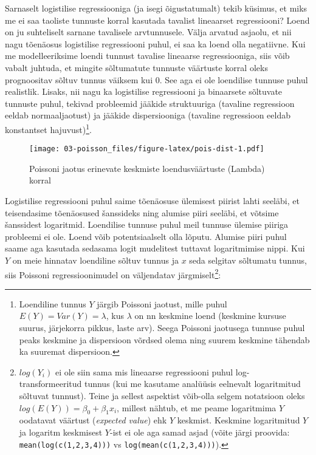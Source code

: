 \documentclass[
]{book}
\begin{document}
Sarnaselt logistilise regressiooniga (ja isegi õigustatumalt) tekib küsimus, et miks me ei saa taoliste tunnuste korral kasutada tavalist lineaarset regressiooni? Loend on ju suhteliselt sarnane tavalisele arvtunnusele. Välja arvatud asjaolu, et nii nagu tõenäosus logistilise regressiooni puhul, ei saa ka loend olla negatiivne. Kui me modelleeriksime loendi tunnust tavalise lineaarse regressiooniga, siis võib vabalt juhtuda, et mingite sõltumatute tunnuste väärtuste korral oleks prognoositav sõltuv tunnus väiksem kui 0. See aga ei ole loendilise tunnuse puhul realistlik. Lisaks, nii nagu ka logistilise regressiooni ja binaarsete sõltuvate tunnuste puhul, tekivad probleemid jääkide struktuuriga (tavaline regressioon eeldab normaaljaotust) ja jääkide dispersiooniga (tavaline regressioon eeldab konstantset hajuvust)\footnote{Loendiline tunnus \(Y\) järgib Poissoni jaotust, mille puhul \(E(Y)=Var(Y)=\lambda\), kus \(\lambda\) on nn keskmine loend (keskmine kursuse suurus, järjekorra pikkus, laste arv). Seega Poissoni jaotusega tunnuse puhul peaks keskmine ja dispersioon võrdsed olema ning suurem keskmine tähendab ka suuremat dispersioon.}.

\begin{figure}
\centering
\texttt{[image: 03-poisson\_files/figure-latex/pois-dist-1.pdf]}
\caption{\label{fig:pois-dist}Poissoni jaotus erinevate keskmiste loendusväärtuste (Lambda) korral}
\end{figure}

Logistilise regressiooni puhul saime tõenäosuse ülemisest piirist lahti seeläbi, et teisendasime tõenäosused šanssideks ning alumise piiri seeläbi, et võtsime šanssidest logaritmid. Loendilise tunnuse puhul meil tunnuse ülemise piiriga probleemi ei ole. Loend võib potentsiaalselt olla lõputu. Alumise piiri puhul saame aga kasutada sedasama logit mudelitest tuttavat logaritmimise nippi. Kui \(Y\) on meie hinnatav loendiline sõltuv tunnus ja \(x\) seda selgitav sõltumatu tunnus, siis Poissoni regressioonimudel on väljendatav järgmiselt\footnote{\(log(Y_i)\) ei ole siin sama mis lineaarse regressiooni puhul log-transformeeritud tunnus (kui me kasutame analüüsis eelnevalt logaritmitud sõltuvat tunnust). Teine ja sellest aspektist võib-olla selgem notatsioon oleks \(log(E(Y))=\beta_0+\beta_1 x_i\), millest nähtub, et me peame logaritmima \(Y\) oodatavat väärtust (\emph{expected value}) ehk \(Y\) keskmist. Keskmine logaritmitud \(Y\) ja logaritm keskmisest \(Y\)-ist ei ole aga samad asjad (võite järgi proovida: \texttt{mean(log(c(1,2,3,4)))} vs \texttt{log(mean(c(1,2,3,4)))}).}:
\end{document}

